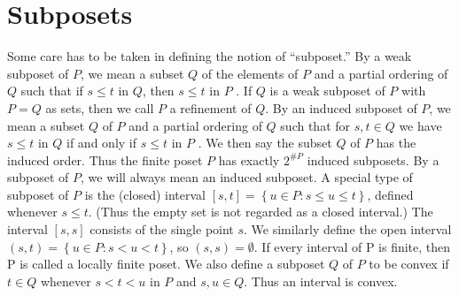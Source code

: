 \section{Subposets}

Some care has to be taken in defining the notion of “subposet.” By a weak subposet of $P$, we mean a subset $Q$ of the elements of $P$ and a partial ordering of $Q$ such that if $s \leq t$ in $Q$, then $s \leq t$ in $P$ . If $Q$ is a weak subposet of $P$ with $P = Q$ as sets, then we call $P$ a refinement of $Q$. By an induced subposet of $P$, we mean a subset $Q$ of $P$ and a partial ordering of $Q$ such that for $s, t \in Q$ we have $s \leq t$ in $Q$ if and only if $s \leq t$ in $P$ . We then say the subset $Q$ of $P$ has the induced order. Thus the finite poset $P$ has exactly $2^{\#P}$ induced subposets. By a subposet of $P$, we will always mean an induced subposet. A special type of subposet of $P$ is the (closed) interval $[s, t] = \left\{{u \in P : s \leq u \leq t}\right\}$, defined whenever $s \leq t$. (Thus the empty set is not regarded as a closed interval.) The interval $[s, s]$ consists of the single point $s$. We similarly define the open interval $(s, t) = \left\{{u \in P : s < u < t}\right\}$, so $(s, s) = \emptyset$. If every interval of P is finite, then P is called a locally finite poset. We also define a subposet $Q$ of $P$ to be convex if $t \in Q$ whenever $s < t < u$ in $P$ and $s, u \in Q$. Thus an interval is convex.